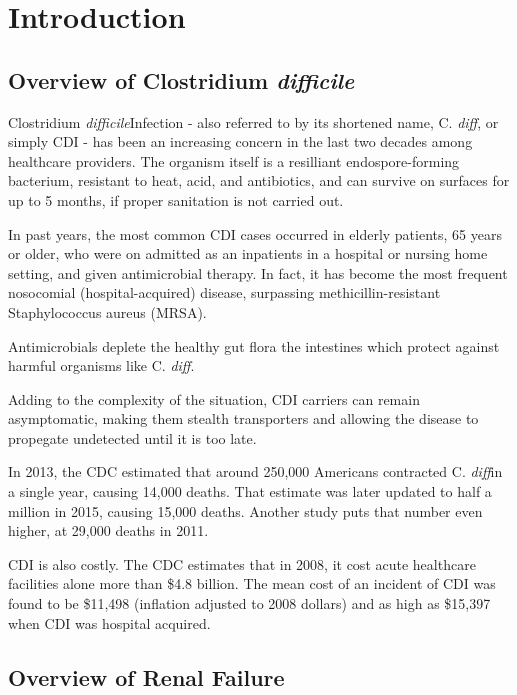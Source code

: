\documentclass[12pt]{ociamthesis}\usepackage[]{graphicx}\usepackage[]{color}
\newcommand{\cdifficile}{Clostridium \textit{difficile}}
\newcommand{\cdiff}{C. \textit{diff}}
\begin{document}
\chapter{Introduction}

\section{Overview of \cdifficile}

\cdifficile Infection - also referred to by its shortened name, \cdiff, or simply CDI -
has been an increasing concern in the last two decades among healthcare providers. 
The organism itself is a resilliant endospore-forming bacterium, resistant to heat, acid, and antibiotics,
and can survive on surfaces for up to 5 months, if proper sanitation is not carried out. \cite{Gerding2008}

In past years, the most common CDI cases occurred in elderly patients, 65 years or older,
who were on admitted as an inpatients in a hospital or nursing home setting, and given antimicrobial therapy.
In fact, it has become the most frequent nosocomial (hospital-acquired) disease, surpassing
methicillin-resistant Staphylococcus aureus (MRSA). \cite{Gupta2014}

Antimicrobials deplete the healthy gut flora the intestines which protect against harmful organisms like \cdiff. \cite{Lamont2017}

Adding to the complexity of the situation, CDI carriers can remain asymptomatic, making them stealth transporters
and allowing the disease to propegate undetected until it is too late. 

In 2013, the CDC estimated that around 250,000 Americans contracted \cdiff in a single year, causing 14,000 deaths.
That estimate was later updated to half a million in 2015, causing 15,000 deaths. \cite{CDC2018}
\cite{CDC2015} 
Another study puts that number even higher, at 29,000 deaths in 2011. 

CDI is also costly. The CDC estimates that in 2008, it cost acute healthcare facilities alone more than \$4.8 billion.
The mean cost of an incident of CDI was found to be \$11,498 (inflation adjusted to 2008 dollars)
and as high as \$15,397 when CDI was hospital acquired. \cite{Dubberke2012}


\section{Overview of Renal Failure}
\end{document}
